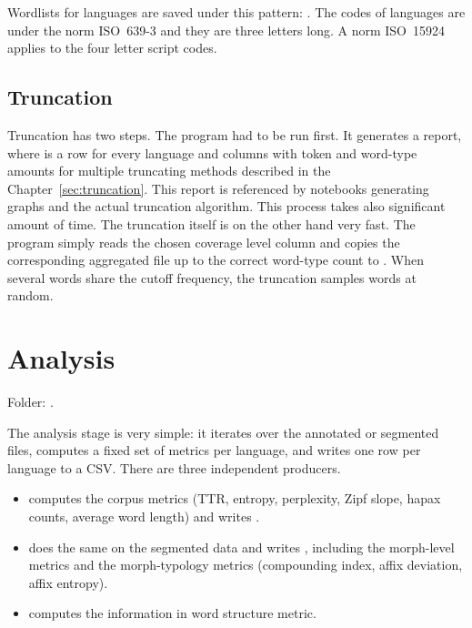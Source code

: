 Wordlists for languages are saved under this pattern: . The codes of languages are under the norm ISO~639-3 and they are three letters long. A norm ISO~15924 applies to the four letter script codes.


\subsection{Truncation}

Truncation has two steps. The program  had to be run first. It generates a report, where is a row for every language and columns with token and word-type amounts for multiple truncating methods described in the Chapter~\ref{sec:truncation}. This report is referenced by notebooks generating graphs and the actual truncation algorithm. This process takes also significant amount of time. The truncation itself is on the other hand very fast. The program  simply reads the chosen coverage level column and copies the corresponding aggregated file up to the correct word-type count to . When several words share the cutoff frequency, the truncation samples words at random.

\newpage
\section{Analysis}

Folder: .

The analysis stage is very simple: it iterates over the annotated or segmented files, computes a fixed set of metrics per language, and writes one row per language to a CSV. There are three independent producers.


\begin{itemize}
    \item {} computes the corpus metrics (TTR, entropy, perplexity, Zipf slope, hapax counts, average word length) and writes .
    \item {} does the same on the segmented data and writes , including the morph-level metrics and the morph-typology metrics (compounding index, affix deviation, affix entropy).
    \item {} computes the information in word structure metric.
\end{itemize}

